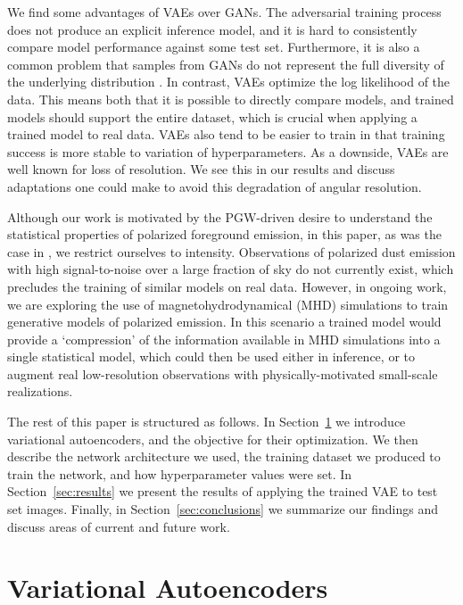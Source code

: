 \documentclass[fleqn,usenatbib]{mnras}
\begin{document}
We find some advantages of VAEs over GANs.
The adversarial training process does not produce an explicit inference model, and it is hard to consistently compare model performance against some test set. Furthermore, it is also a common problem that samples from GANs do not represent the full diversity of the underlying distribution \citep{grover/etal:2018}. In contrast, VAEs optimize the log likelihood of the data. This means both that it is possible to directly compare models, and trained models should support the entire dataset, which is crucial when applying a trained model to real data. VAEs also tend to be easier to train in that training success is more stable to variation of hyperparameters. As a downside, VAEs are well known for loss of resolution. We see this in our results and discuss adaptations one could make to avoid this degradation of angular resolution. 

Although our work is motivated by the PGW-driven desire to understand the statistical properties of polarized foreground emission, in this paper, as was the case in \cite{aylor/etal:2019}, we restrict ourselves to intensity. Observations of polarized dust emission with high signal-to-noise over a large fraction of sky do not currently exist, which precludes the training of similar models on real data. However, in ongoing work, we are exploring the use of magnetohydrodynamical (MHD) \citep{kim/etal:2019} simulations to train generative models of polarized emission. In this scenario a trained model would provide a `compression' of the information available in MHD simulations into a single statistical model, which could then be used either in inference, or to augment real low-resolution observations with physically-motivated small-scale realizations. 

The rest of this paper is structured as follows.  In Section~\ref{sec:variational_autoencoders} we introduce variational autoencoders, and the objective for their optimization. We then describe the network architecture we used, the training dataset we produced to train the network, and how hyperparameter values were set. In Section~\ref{sec:results} we present the results of applying the trained VAE to test set images. Finally, in Section~\ref{sec:conclusions} we summarize our findings and discuss areas of current and future work.

\section{Variational Autoencoders}
\label{sec:variational_autoencoders} 
\end{document}
